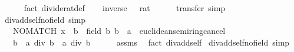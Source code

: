 \begin{isabellebody}
\ \ \ \ \isamarkupfalse%
\ {\isacharparenleft}{\kern0pt}fact\ divide{\isacharunderscore}{\kern0pt}rat{\isacharunderscore}{\kern0pt}def{\isacharparenright}{\kern0pt}\isanewline
\ \ \isamarkupfalse%
\ {\isachardoublequoteopen}inverse\ {}\ {\isacharequal}{\kern0pt}\ {\isacharparenleft}{\kern0pt}{}{\isacharcolon}{\kern0pt}{\isacharcolon}{\kern0pt}rat{\isacharparenright}{\kern0pt}{\isachardoublequoteclose}\isanewline
\ \ \ \ \isamarkupfalse%
\ transfer\ simp\isanewline
{}\isamarkupfalse%
%
\endisatagproof
{\isafoldproof}%
%
\isadelimproof
\isanewline
%
\endisadelimproof
\isanewline
{}\isamarkupfalse%
\isanewline
\isanewline
\isanewline
{}\isamarkupfalse%
\ div{\isacharunderscore}{\kern0pt}add{\isacharunderscore}{\kern0pt}self{}{\isacharunderscore}{\kern0pt}no{\isacharunderscore}{\kern0pt}field\ {\isacharbrackleft}{\kern0pt}simp{\isacharbrackright}{\kern0pt}{\isacharcolon}{\kern0pt}\isanewline
\ \ \ {\isachardoublequoteopen}NO{\isacharunderscore}{\kern0pt}MATCH\ {\isacharparenleft}{\kern0pt}x\ {\isacharcolon}{\kern0pt}{\isacharcolon}{\kern0pt}\ {\isacharprime}{\kern0pt}b\ {\isacharcolon}{\kern0pt}{\isacharcolon}{\kern0pt}\ field{\isacharparenright}{\kern0pt}\ b{\isachardoublequoteclose}\ {\isachardoublequoteopen}{\isacharparenleft}{\kern0pt}b\ {\isacharcolon}{\kern0pt}{\isacharcolon}{\kern0pt}\ {\isacharprime}{\kern0pt}a\ {\isacharcolon}{\kern0pt}{\isacharcolon}{\kern0pt}\ euclidean{\isacharunderscore}{\kern0pt}semiring{\isacharunderscore}{\kern0pt}cancel{\isacharparenright}{\kern0pt}\ {\isasymnoteq}\ {}{\isachardoublequoteclose}\isanewline
\ \ \ {\isachardoublequoteopen}{\isacharparenleft}{\kern0pt}b\ {\isacharplus}{\kern0pt}\ a{\isacharparenright}{\kern0pt}\ div\ b\ {\isacharequal}{\kern0pt}\ a\ div\ b\ {\isacharplus}{\kern0pt}\ {}{\isachardoublequoteclose}\isanewline
%
\isadelimproof
\ \ %
\endisadelimproof
%
\isatagproof
{}\isamarkupfalse%
\ assms{\isacharparenleft}{\kern0pt}{}{\isacharparenright}{\kern0pt}\ \isamarkupfalse%
\ {\isacharparenleft}{\kern0pt}fact\ div{\isacharunderscore}{\kern0pt}add{\isacharunderscore}{\kern0pt}self{}{\isacharparenright}{\kern0pt}%
\endisatagproof
{\isafoldproof}%
%
\isadelimproof
\isanewline
%
\endisadelimproof
\isanewline
{}\isamarkupfalse%
\ div{\isacharunderscore}{\kern0pt}add{\isacharunderscore}{\kern0pt}self{}{\isacharunderscore}{\kern0pt}no{\isacharunderscore}{\kern0pt}field\ {\isacharbrackleft}{\kern0pt}simp{\isacharbrackright}{\kern0pt}{\isacharcolon}{\kern0pt}\isanewline

\end{isabellebody}
